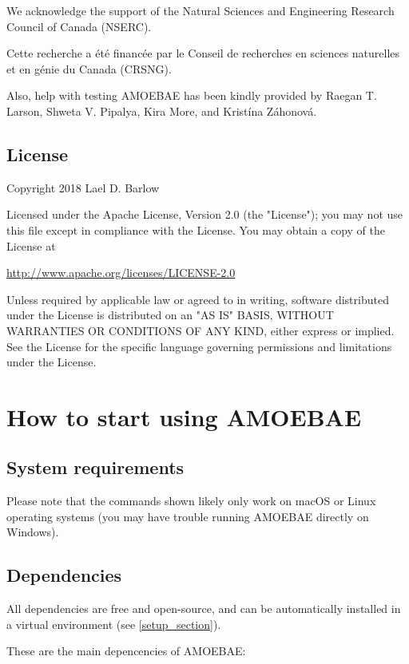 \documentclass[12pt,letterpaper]{article}
\begin{document}
\begin{linenumbers}
We acknowledge the support of the Natural Sciences and Engineering Research Council of Canada (NSERC).

Cette recherche a été financée par le Conseil de recherches en sciences naturelles et en génie du Canada (CRSNG).

Also, help with testing AMOEBAE has been kindly provided by Raegan T. Larson,
Shweta V. Pipalya, Kira More, and Kristína Záhonová.

\subsection{License}
\label{license_section}

Copyright 2018 Lael D. Barlow

Licensed under the Apache License, Version 2.0 (the "License"); you may not use this file except in compliance with the License. You may obtain a copy of the License at

\url{http://www.apache.org/licenses/LICENSE-2.0}

Unless required by applicable law or agreed to in writing, software distributed under the License is distributed on an "AS IS" BASIS, WITHOUT WARRANTIES OR CONDITIONS OF ANY KIND, either express or implied. See the License for the specific language governing permissions and limitations under the License.


\section{How to start using AMOEBAE}

\subsection{System requirements}

Please note that the commands shown likely only work on macOS or Linux operating
systems (you may have trouble running AMOEBAE directly on Windows). 


\subsection{Dependencies}
\label{dependencies_section}

All dependencies are free and open-source, and can be automatically installed
in a virtual environment (see \autoref*{setup_section}).

These are the main depencencies of AMOEBAE:


\end{linenumbers}
\end{document}
